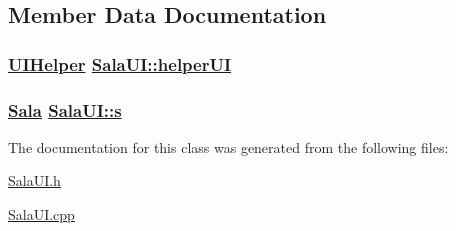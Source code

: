\subsection{Member Data Documentation}
\hypertarget{class_sala_u_i_165ca02db075e280199e0970e3465900}{
\subsubsection[helperUI]{\setlength{\rightskip}{0pt plus 5cm}\hyperlink{class_u_i_helper}{UIHelper} \hyperlink{class_sala_u_i_165ca02db075e280199e0970e3465900}{Sala\-UI::helper\-UI}}}
\label{class_sala_u_i_165ca02db075e280199e0970e3465900}


\hypertarget{class_sala_u_i_03c7c0ace395d80182db07ae2c30f034}{
\subsubsection[s]{\setlength{\rightskip}{0pt plus 5cm}\hyperlink{class_sala}{Sala} \hyperlink{class_sala_u_i_03c7c0ace395d80182db07ae2c30f034}{Sala\-UI::s}}}
\label{class_sala_u_i_03c7c0ace395d80182db07ae2c30f034}




The documentation for this class was generated from the following files:\begin{CompactItemize}
\item 
\hyperlink{_sala_u_i_8h}{Sala\-UI.h}\item 
\hyperlink{_sala_u_i_8cpp}{Sala\-UI.cpp}\end{CompactItemize}

